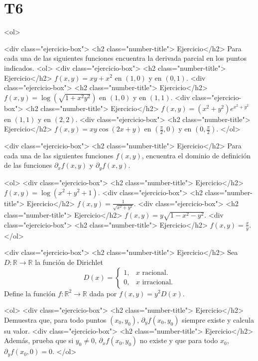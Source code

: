 \documentclass{article}
\theoremstyle{definition}
\begin{document}
  \section*{T6 }

  <ol>

       <div class="ejercicio-box"> <h2 class="number-title"> Ejercicio</h2> Para cada una de las siguientes funciones encuentra la derivada parcial en los puntos indicados.
       <ol>
       <div class="ejercicio-box"> <h2 class="number-title"> Ejercicio</h2> $f(x,y)=xy+x^2$ en $(1,0)$ y en $(0,1)$.
       <div class="ejercicio-box"> <h2 class="number-title"> Ejercicio</h2> $f(x,y)=\log(\sqrt{1+x^2y^2})$ en $(1,0)$ y en $(1,1)$.
       <div class="ejercicio-box"> <h2 class="number-title"> Ejercicio</h2> $f(x,y)=(x^2+y^2)e^{x^2+y^2}$ en $(1,1)$ y en $(2,2)$.
       <div class="ejercicio-box"> <h2 class="number-title"> Ejercicio</h2> $f(x,y)=xy\cos(2x+y)$ en $(\frac{\pi}{2},0)$ y en $(0,\frac{\pi}{2})$.
       </ol>
       

     <div class="ejercicio-box"> <h2 class="number-title"> Ejercicio</h2> Para cada una de las siguientes funciones $f(x,y)$, encuentra el dominio de definición
       de las funciones $\partial_xf(x,y)$ y $\partial_yf(x,y)$.

       <ol>
       <div class="ejercicio-box"> <h2 class="number-title"> Ejercicio</h2> $f(x,y)=\log(x^2+y^2+1)$.
       <div class="ejercicio-box"> <h2 class="number-title"> Ejercicio</h2> $f(x,y)=\frac{1}{\sqrt{x^2+y^2}}$.
       <div class="ejercicio-box"> <h2 class="number-title"> Ejercicio</h2> $f(x,y)=y\sqrt{1-x^2-y^2}$.
         <div class="ejercicio-box"> <h2 class="number-title"> Ejercicio</h2> $f(x,y)=\frac{x}{y}$.
       </ol>


       
     <div class="ejercicio-box"> <h2 class="number-title"> Ejercicio</h2> Sea $D:\mathbb{R}\to \mathbb{R}$ la función de Dirichlet
		$$
		D(x)=\left\{
		\begin{array}{cc}
		1, & \textrm{$x$ racional.}\\
		0, & \textrm{$x$ irracional.}
		\end{array}
		\right.	
		$$
       Define la función $f:\mathbb{R}^2 \to \mathbb{R}$ dada por $f(x,y)=y^2D(x)$.
       
       <ol>
       <div class="ejercicio-box"> <h2 class="number-title"> Ejercicio</h2> Demuestra que, para todo puntos $(x_0,y_0)$, $\partial_yf(x_0,y_0)$ siempre existe y calcula su valor.
       <div class="ejercicio-box"> <h2 class="number-title"> Ejercicio</h2> Además, prueba que si $y_0\ne 0$, $\partial_xf(x_0,y_0)$ no existe y que para todo
       $x_0$, $\partial_yf(x_0,0)=0$. 
       </ol>
\end{document}
